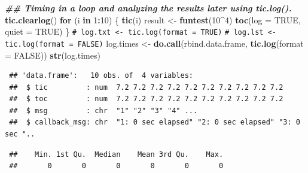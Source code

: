 \documentclass[
  spanish,
  10pt,
]{book}
\newenvironment{Shaded}{\begin{snugshade}}{\end{snugshade}}
\newcommand{\AttributeTok}[1]{\textcolor[rgb]{0.13,0.29,0.53}{#1}}
\newcommand{\CommentTok}[1]{\textcolor[rgb]{0.56,0.35,0.01}{\textit{#1}}}
\newcommand{\ConstantTok}[1]{\textcolor[rgb]{0.56,0.35,0.01}{#1}}
\newcommand{\ControlFlowTok}[1]{\textcolor[rgb]{0.13,0.29,0.53}{\textbf{#1}}}
\newcommand{\DecValTok}[1]{\textcolor[rgb]{0.00,0.00,0.81}{#1}}
\newcommand{\DocumentationTok}[1]{\textcolor[rgb]{0.56,0.35,0.01}{\textbf{\textit{#1}}}}
\newcommand{\FunctionTok}[1]{\textcolor[rgb]{0.13,0.29,0.53}{\textbf{#1}}}
\newcommand{\NormalTok}[1]{#1}
\newcommand{\OtherTok}[1]{\textcolor[rgb]{0.56,0.35,0.01}{#1}}
\newcommand{\SpecialCharTok}[1]{\textcolor[rgb]{0.81,0.36,0.00}{\textbf{#1}}}
\theoremstyle{break}
\theoremstyle{nonumberplain}
\renewcommand{\CommentTok}[1]{\textcolor[rgb]{0.41,0.41,0.41}{\texttt{#1}}}
\begin{document}
\begin{Shaded}
\begin{Highlighting}[]
\DocumentationTok{\#\# Timing in a loop and analyzing the results later using tic.log().}
\FunctionTok{tic.clearlog}\NormalTok{()}
\ControlFlowTok{for}\NormalTok{ (i }\ControlFlowTok{in} \DecValTok{1}\SpecialCharTok{:}\DecValTok{10}\NormalTok{)}
\NormalTok{\{}
   \FunctionTok{tic}\NormalTok{(i)}
\NormalTok{   result }\OtherTok{\textless{}{-}} \FunctionTok{funtest}\NormalTok{(}\DecValTok{10}\SpecialCharTok{\^{}}\DecValTok{4}\NormalTok{)}
   \FunctionTok{toc}\NormalTok{(}\AttributeTok{log =} \ConstantTok{TRUE}\NormalTok{, }\AttributeTok{quiet =} \ConstantTok{TRUE}\NormalTok{)}
\NormalTok{\}}
\CommentTok{\# log.txt \textless{}{-} tic.log(format = TRUE)}
\CommentTok{\# log.lst \textless{}{-} tic.log(format = FALSE)}
\NormalTok{log.times }\OtherTok{\textless{}{-}} \FunctionTok{do.call}\NormalTok{(rbind.data.frame, }\FunctionTok{tic.log}\NormalTok{(}\AttributeTok{format =} \ConstantTok{FALSE}\NormalTok{))}
\FunctionTok{str}\NormalTok{(log.times)}
\end{Highlighting}
\end{Shaded}

\begin{verbatim}
 ## 'data.frame':   10 obs. of  4 variables:
 ##  $ tic         : num  7.2 7.2 7.2 7.2 7.2 7.2 7.2 7.2 7.2 7.2
 ##  $ toc         : num  7.2 7.2 7.2 7.2 7.2 7.2 7.2 7.2 7.2 7.2
 ##  $ msg         : chr  "1" "2" "3" "4" ...
 ##  $ callback_msg: chr  "1: 0 sec elapsed" "2: 0 sec elapsed" "3: 0 sec "..
\end{verbatim}

\begin{Shaded}
\end{Shaded}

\begin{verbatim}
 ##    Min. 1st Qu.  Median    Mean 3rd Qu.    Max. 
 ##       0       0       0       0       0       0
\end{verbatim}
\end{document}
